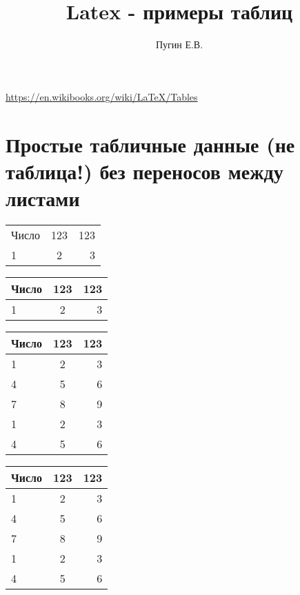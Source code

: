 \documentclass{article}
\title{Latex - примеры таблиц}
\author{Пугин Е.В.}
\begin{document}
\maketitle
\newpage

\tableofcontents
\newpage

\url{https://en.wikibooks.org/wiki/LaTeX/Tables}

\bigskip

\section{Простые табличные данные (не таблица!) без переносов между листами}



\bigskip

\begin{tabular}{ l  c  r }
Число & 123 & 123 \\
  1 & 2 & 3 \\
\end{tabular}
\bigskip

\begin{tabular}{ l  c  r }
 \hline		
Число & 123 & 123 \\
 \hline		
  1 & 2 & 3 \\
 \hline		
\end{tabular}
\bigskip

\begin{tabular}{ | l | c | r |}
 \hline		
Число & 123 & 123 \\ \hline		
  1 & 2 & 3 \\ \hline		
  4 & 5 & 6 \\ \hline		
  7 & 8 & 9 \\ \hline
  1 & 2 & 3 \\ \hline
  4 & 5 & 6 \\ \hline
\end{tabular}
\bigskip

\begin{tabular}{ l | c | r }
 \hline		
Число & 123 & 123 \\
 \hline		
  1 & 2 & 3 \\
  4 & 5 & 6 \\
  7 & 8 & 9 \\
  1 & 2 & 3 \\
  4 & 5 & 6 \\
 \hline		
\end{tabular}
\bigskip
\end{document}

